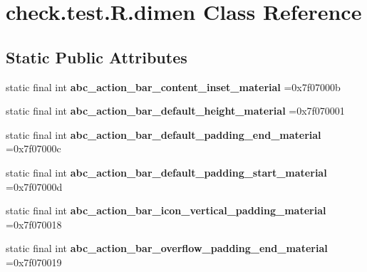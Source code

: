 \hypertarget{classcheck_1_1test_1_1_r_1_1dimen}{}\section{check.\+test.\+R.\+dimen Class Reference}
\label{classcheck_1_1test_1_1_r_1_1dimen}
\subsection*{Static Public Attributes}
\begin{DoxyCompactItemize}
\item 
\hypertarget{classcheck_1_1test_1_1_r_1_1dimen_af8791e998f4065b67a9c0017c861f5d9}{}static final int {\bfseries abc\+\_\+action\+\_\+bar\+\_\+content\+\_\+inset\+\_\+material} =0x7f07000b\label{classcheck_1_1test_1_1_r_1_1dimen_af8791e998f4065b67a9c0017c861f5d9}

\item 
\hypertarget{classcheck_1_1test_1_1_r_1_1dimen_a38ae460b19eb7368dd2fefda56cbe7ad}{}static final int {\bfseries abc\+\_\+action\+\_\+bar\+\_\+default\+\_\+height\+\_\+material} =0x7f070001\label{classcheck_1_1test_1_1_r_1_1dimen_a38ae460b19eb7368dd2fefda56cbe7ad}

\item 
\hypertarget{classcheck_1_1test_1_1_r_1_1dimen_aba5f5173544414aedb06612c16488e8a}{}static final int {\bfseries abc\+\_\+action\+\_\+bar\+\_\+default\+\_\+padding\+\_\+end\+\_\+material} =0x7f07000c\label{classcheck_1_1test_1_1_r_1_1dimen_aba5f5173544414aedb06612c16488e8a}

\item 
\hypertarget{classcheck_1_1test_1_1_r_1_1dimen_a288de3730e75f6ae54f92d2615c61d26}{}static final int {\bfseries abc\+\_\+action\+\_\+bar\+\_\+default\+\_\+padding\+\_\+start\+\_\+material} =0x7f07000d\label{classcheck_1_1test_1_1_r_1_1dimen_a288de3730e75f6ae54f92d2615c61d26}

\item 
\hypertarget{classcheck_1_1test_1_1_r_1_1dimen_a53a51402fac4702df79d782042907c3d}{}static final int {\bfseries abc\+\_\+action\+\_\+bar\+\_\+icon\+\_\+vertical\+\_\+padding\+\_\+material} =0x7f070018\label{classcheck_1_1test_1_1_r_1_1dimen_a53a51402fac4702df79d782042907c3d}

\item 
\hypertarget{classcheck_1_1test_1_1_r_1_1dimen_a6e171c9254943503176474614ed66d6e}{}static final int {\bfseries abc\+\_\+action\+\_\+bar\+\_\+overflow\+\_\+padding\+\_\+end\+\_\+material} =0x7f070019\label{classcheck_1_1test_1_1_r_1_1dimen_a6e171c9254943503176474614ed66d6e}


\end{DoxyCompactItemize}
